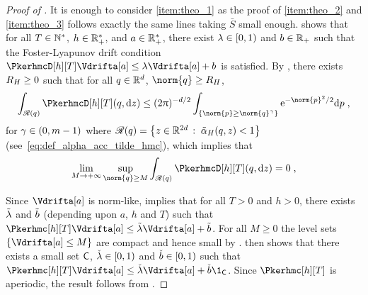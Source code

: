 \begin{proof}[Proof of ]
  It is enough to consider \ref{item:theo_1} as the proof
  of  \ref{item:theo_2} and \ref{item:theo_3} follows exactly the same lines
  taking $\bar{S}$ small enough.   shows that for all $T \in \mathbb{N}^{*}$,  $h \in \mathbb{R}^*_+$, and $a \in \mathbb{R}^*_+$, there exist $\lambda \in \left[0,1\right)$ and $b \in \mathbb{R}_+$ such that the Foster-Lyapunov drift condition
  $\PkerhmcD[h][T] \Vdrifta[\a] \leq \lambda  \Vdrifta[\a] + \b$ is satisfied.
  By , there exists $R_{H} \geq 0$ such that for all $q \in \mathbb{R}^d$, $\norm{\q} \geq R_{\Ham}$,
\begin{equation}
\label{eq:proofpgeo_erg_0}
  \int_{\rejectregion(q)}   \PkerhmcD[h][T](\q, \rmd z ) \leq (2\uppi)^{-d/2} \int_{\{ \norm{\p} \geq \norm{q}^{\gamma}\} } \rme^{-\norm{p}^2/2} \rmd p \eqsp,
\end{equation}
for $\gamma \in \left(0,m-1\right)$ where $\mathscr{R}(q) = \left\{z \in \mathbb{R}^{2d}\,:\; \tilde{\alpha}_{H}(q,z) < 1 \right\}$ (see~\eqref{eq:def_alpha_acc_tilde_hmc}), which implies that
\begin{equation}
\label{eq:proof:geo_erg:1}
  \lim_{M \to \plusinfty} \sup_{\norm{\q} \geq M} \int_{\rejectregion(q)} \PkerhmcD[h][T](\q, \rmd z ) = 0 \eqsp,
\end{equation}


Since $\Vdrifta[a]$ is norm-like,   implies that  for all $T > 0$ and $h > 0$, there exists $\tilde{\lambda}$ and $\tilde{b}$ (depending upon $a$, $h$ and $T$) such that
$\Pkerhmc[h][T] \Vdrifta[a] \leq \lambdageotilde \Vdrifta[a] + \bgeotilde$.
For all $M \geq 0$ the level sets $\{ \Vdrifta[a] \leq M\}$ are compact and hence small by .
\cite[Corollary~14.1.6]{douc:moulines:priouret:2018} then shows that there exists a small set $\mathsf{C}$, $\check{\lambda} \in \left[0,1\right)$ and $\check{b} \in \left[0,1\right)$ such that $\Pkerhmc[h][T] \Vdrifta[a] \leq \check{\lambda} \Vdrifta[a] + \check{b} \1_{\msc}$.  Since $\Pkerhmc[h][T]$ is aperiodic, the result follows from \cite[Theorem~15.2.4]{douc:moulines:priouret:2018}.
\end{proof}

